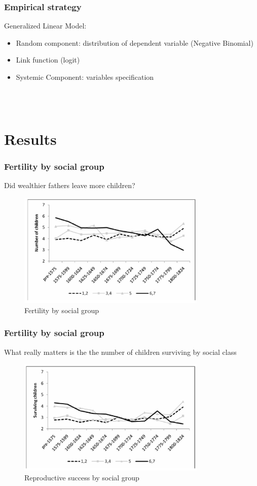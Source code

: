\documentclass[pdftex,12pt,xcolor=pdftex,table]{beamer}
\begin{document}
\begin{frame}
\frametitle{Empirical strategy} 
Generalized Linear Model: 
\begin{itemize}
    \item Random component: distribution of dependent variable (Negative Binomial) 
    \item Link function (logit)
    \item Systemic Component:  variables specification 
  \end{itemize}\\~\\

\end{frame}

\section{Results}
\begin{frame}
\frametitle{Fertility by social group} 
Did wealthier fathers leave more children?
\begin{figure}[h!]
    \centering
    \includegraphics[width=9cm]{figure3.PNG}
    \caption{Fertility by social group}
 \end{figure}
\end{frame}

\begin{frame}
\frametitle{Fertility by social group} 
What really matters is the the number of children surviving by social class
\begin{figure}[h!]
    \centering
    \includegraphics[width=9cm]{figure4.PNG}
    \caption{Reproductive success by social group}
 \end{figure}
\end{frame}
\end{document}
